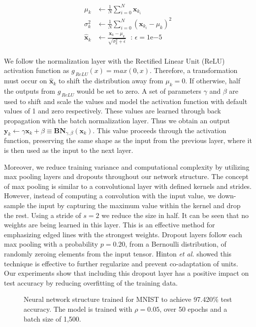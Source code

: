 \documentclass[conference]{IEEEtran}
\newcommand{\xv}{\mathbf{x}}
\newcommand{\yv}{\mathbf{y}}
\newcommand{\Bv}{\mathbf{B}}
\newcommand{\Nv}{\mathbf{N}}
\begin{document}
\begin{align*}
    \mu_k &\leftarrow \frac{1}{N} \sum_{i=0}^N{\xv_{k_i}} \\
    \sigma^2_k &\leftarrow \frac{1}{N} \sum_{i=0}^N{(\xv_{k_i} - \mu_k)^2} \\
    \hat{\xv}_k &\leftarrow \frac{\xv_k - \mu_k}{\sqrt{\sigma^2_k + \epsilon}} \; 
    \text{ : } \epsilon = 1\mathrm{e}{-5}\\
\end{align*}

\noindent
We follow the normalization layer with the Rectified Linear Unit (ReLU) activation function as $g_{\,ReLU}(x) = max(0, x)$. Therefore, a transformation must occur on $\hat{\xv}_k$ to shift the distribution away from $\mu_k = 0$. If otherwise, half the outputs from $g_{\,ReLU}$ would be set to zero. A set of parameters $\gamma$ and $\beta$ are used to shift and scale the values and model the activation function with default values of 1 and zero respectively. These values are learned through back propagation with the batch normalization layer. Thus we obtain an output $\yv_k \leftarrow \gamma \xv_k + \beta \equiv \Bv\Nv_{\gamma, \beta}(\xv_k)$. This value proceeds through the activation function, preserving the same shape as the input from the previous layer, where it is then used as the input to the next layer.

Moreover, we reduce training variance and computational complexity by utilizing max pooling layers and dropouts throughout our network structure. The concept of max pooling is similar to a convolutional layer with defined kernels and strides. However, instead of computing a convolution with the input value, we down-sample the input by capturing the maximum value within the kernel and drop the rest. Using a stride of $s = 2$ we reduce the size in half. It can be seen that no weights are being learned in this layer. This is an effective method for emphasizing edged lines with the strongest weights. Dropout layers follow each max pooling with a probability $p = 0.20$, from a Bernoulli distribution, of randomly zeroing elements from the input tensor. Hinton {\it et al.} \cite{hinton2012improving} showed this technique is effective to further regularize and prevent co-adaptation of units. Our experiments show that including this dropout layer has a positive impact on test accuracy by reducing overfitting of the training data. 

\begin{figure}[!b]
	\centering
	
	\captionsetup{width=1\linewidth}
	\caption{Neural network structure trained for MNIST to achieve 97.420\% test accuracy. The model is trained with $\rho = 0.05$, over 50 epochs and a batch size of 1,500.}
	\label{fig:mnist_network_structure}
\end{figure}
\end{document}
